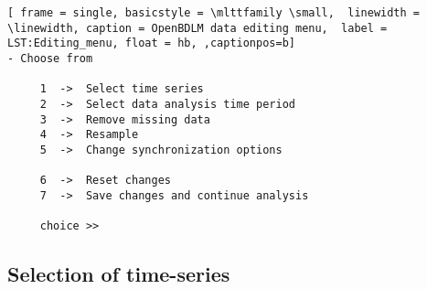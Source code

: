 \documentclass{article}
\begin{document}


\begin{lstlisting}[ frame = single, basicstyle = \mlttfamily \small,  linewidth = \linewidth, caption = OpenBDLM data editing menu,  label = LST:Editing_menu, float = hb, ,captionpos=b]
- Choose from

     1  ->  Select time series
     2  ->  Select data analysis time period 
     3  ->  Remove missing data
     4  ->  Resample
     5  ->  Change synchronization options

     6  ->  Reset changes
     7  ->  Save changes and continue analysis

     choice >> 
\end{lstlisting}    

\subsection{Selection of time-series}
\label{SS:SelectionTimeSeries}
\end{document}

